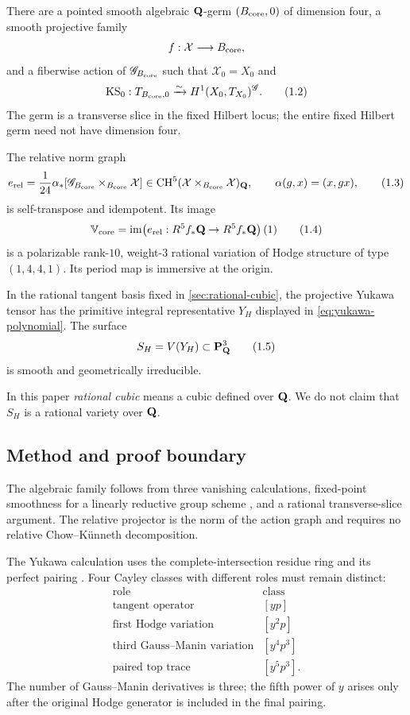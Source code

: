\begin{theorem}
\label{thm:main}
There are a pointed smooth algebraic \(\mathbf Q\)-germ
\((B_{\mathrm{core}},0)\) of dimension four, a smooth projective family
\[
 f:\mathcal X\longrightarrow B_{\mathrm{core}},
\]
and a fiberwise action of \(\mathscr G_{B_{\mathrm{core}}}\) such that
\(\mathcal X_0=X_0\) and
\[
 \operatorname{KS}_0:T_{B_{\mathrm{core}},0}\xrightarrow{\sim}
 H^1(X_0,T_{X_0})^{\mathscr G}.                       \tag{1.2}
\]
The germ is a transverse slice in the fixed Hilbert locus; the entire fixed
Hilbert germ need not have dimension four.

The relative norm graph
\[
 e_{\mathrm{rel}}
 =\frac1{24}\alpha_*[\mathscr G_{B_{\mathrm{core}}}\times_{B_{\mathrm{core}}}\mathcal X]
 \in\operatorname{CH}^5(\mathcal X\times_{B_{\mathrm{core}}}\mathcal X)_{\mathbf Q},
 \qquad \alpha(g,x)=(x,gx),                         \tag{1.3}
\]
is self-transpose and idempotent.  Its image
\[
 \mathbb V_{\mathrm{core}}=
 \operatorname{im}\!\left(e_{\mathrm{rel}}:R^5f_*\mathbf Q\to R^5f_*\mathbf Q\right)(1)  \tag{1.4}
\]
is a polarizable rank-\(10\), weight-\(3\) rational variation of Hodge
structure of type \((1,4,4,1)\).  Its period map is immersive at the
origin.

In the rational tangent basis fixed in \cref{sec:rational-cubic}, the
projective Yukawa tensor has the primitive integral representative
\(Y_H\) displayed in \cref{eq:yukawa-polynomial}.  The surface
\[
 S_H=V(Y_H)\subset\mathbf P^3_{\mathbf Q}                        \tag{1.5}
\]
is smooth and geometrically irreducible.
\end{theorem}

In this paper \emph{rational cubic} means a cubic defined over \(\mathbf Q\).
We do not claim that \(S_H\) is a rational variety over \(\mathbf Q\).

\subsection{Method and proof boundary}

The algebraic family follows from three vanishing calculations, fixed-point
smoothness for a linearly reductive group scheme
\cite{Hartshorne2010,Romagny2022}, and a rational transverse-slice
argument.  The relative projector is the norm of the action graph and
requires no relative Chow--K\"unneth decomposition.

The Yukawa calculation uses the complete-intersection residue ring and its
perfect pairing \cite{Nagel1997,Konno1991}.  Four Cayley classes with
different roles must remain distinct:
\[
\begin{array}{c|c}
\text{role}&\text{class}\\ \hline
\text{tangent operator}&[yp]\\
\text{first Hodge variation}&[y^2p]\\
\text{third Gauss--Manin variation}&[y^4p^3]\\
\text{paired top trace}&[y^5p^3].
\end{array}                                         \tag{1.6}
\]
The number of Gauss--Manin derivatives is three; the fifth power of \(y\)
arises only after the original Hodge generator is included in the final
pairing.

